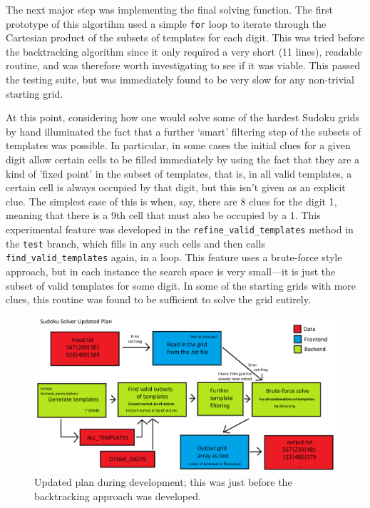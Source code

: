 \documentclass[12pt]{article}
\begin{document}
The next major step was implementing the final solving function.
The first prototype of this algortihm used a simple \texttt{for} loop to iterate through the Cartesian product of the subsets of templates for each digit.
This was tried before the backtracking algorithm since it only required a very short (11 lines), readable routine, and was therefore worth investigating to see if it was viable.
This passed the testing suite, but was immediately found to be very slow for any non-trivial starting grid.

At this point, considering how one would solve some of the hardest Sudoku grids by hand illuminated the fact that a further `smart' filtering step of the subsets of templates was possible.
In particular, in some cases the initial clues for a given digit allow certain cells to be filled immediately by using the fact that they are a kind of 'fixed point' in the subset of templates, that is, in all valid templates, a certain cell is always occupied by that digit, but this isn't given as an explicit clue.
The simplest case of this is when, say, there are 8 clues for the digit 1, meaning that there is a 9th cell that must also be occupied by a 1.
This experimental feature was developed in the \texttt{refine\_valid\_templates} method in the \texttt{test} branch, which fills in any such cells and then calls \texttt{find\_valid\_templates} again, in a loop.
This feature uses a brute-force style approach, but in each instance the search space is very small---it is just the subset of valid templates for some digit.
In some of the starting grids with more clues, this routine was found to be sufficient to solve the grid entirely.

\begin{figure}[hbt]
    \includegraphics[scale=0.22]{sudokuplan2.png}
    \caption{Updated plan during development; this was just before the backtracking approach was developed.}
    \label{plan2}
\end{figure}
\end{document}
